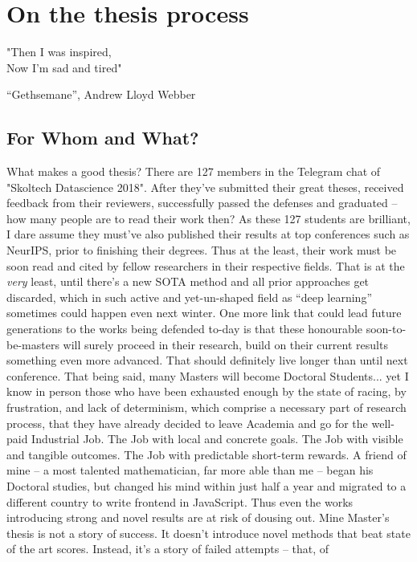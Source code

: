 \chapter{On the thesis process} \label{chap:processes}

\epigraph{"Then I was inspired,\\
Now I'm sad and tired"
}{``Gethsemane'', Andrew Lloyd Webber}

\section*{For Whom and What?}

What makes a good thesis? There are 127 members in the Telegram chat of
"Skoltech Datascience 2018". After they've submitted their great theses,
received feedback from their reviewers, successfully passed the defenses and
graduated -- how many people are to read their work then? As these 127 students
are brilliant, I dare assume they must've also published their results at top
conferences such as NeurIPS, prior to finishing their degrees. Thus at the
least, their work must be soon read and cited by fellow researchers in their
respective fields.  That is at the \emph{very} least, until there's a new SOTA
method and all prior approaches get discarded, which in such active and
yet-un-shaped field as ``deep learning'' sometimes could happen even next
winter. One more link that could lead future generations to the works being
defended to-day is that these honourable soon-to-be-masters will surely proceed
in their research, build on their current results something even more advanced.
That should definitely live longer than until next conference.  That being
said, many Masters will become Doctoral Students... yet I know in person those
who have been exhausted enough by the state of racing, by frustration, and lack
of determinism, which comprise a necessary part of research process, that they
have already decided to leave Academia and go for the well-paid Industrial Job.
The Job with local and concrete goals.  The Job with visible and tangible
outcomes. The Job with predictable short-term rewards.  A friend of mine -- a
most talented mathematician, far more able than me -- began his Doctoral
studies, but changed his mind within just half a year and migrated to a
different country to write frontend in JavaScript. Thus even the works
introducing strong and novel results are at risk of dousing out. Mine Master's
thesis is not a story of success. It doesn't introduce novel methods that beat
state of the art scores. Instead, it's a story of failed attempts -- that, of
